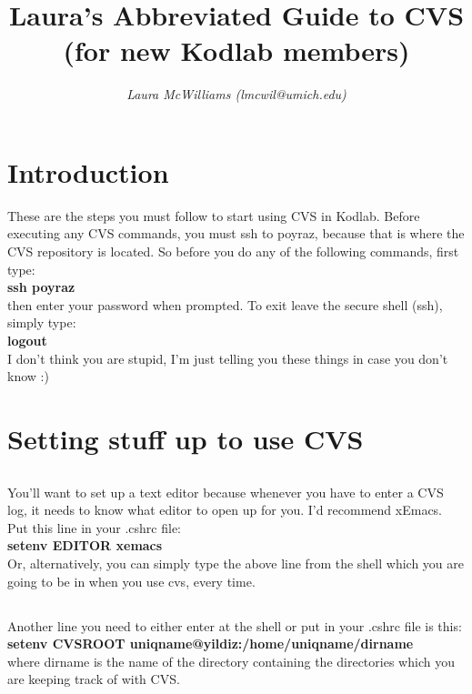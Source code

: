 \documentclass[12pt, letterpaper]{article}
\begin{document}
\title{\bf {\Large Laura's Abbreviated Guide to CVS}\\ 
           {\large (for new Kodlab members)}}
\author{\large \it Laura McWilliams (lmcwil@umich.edu)}
\maketitle 

\section*{Introduction}
These are the steps you must follow to start using CVS in
Kodlab. Before executing any CVS commands, you must ssh to poyraz,
because that is where the CVS repository is located. So before you do
any of the following commands, first type:\\
{\bf ssh poyraz}\\
then enter your password when prompted. To exit leave the secure shell 
(ssh), simply type:\\
{\bf logout}\\
I don't think you are stupid, I'm just telling you these things in
case you don't know :)



\section{Setting stuff up to use CVS}
  \subsection{}
You'll want to set up a text editor because whenever you 
have to enter a CVS log, it needs to know what editor to open up for
you. I'd recommend xEmacs. Put this line in your .cshrc file:\\
      {\bf setenv EDITOR xemacs }\\
Or, alternatively, you can simply type the above line from the shell
which you are going to be in when you use cvs, every time. 
  \subsection{}
Another line you need to either enter at the shell or
put in your .cshrc file is this:\\
      {\bf setenv CVSROOT uniqname@yildiz:/home/uniqname/dirname }\\
      where dirname is the name of the directory containing the
      directories which you are keeping track of with CVS.
\end{document}
